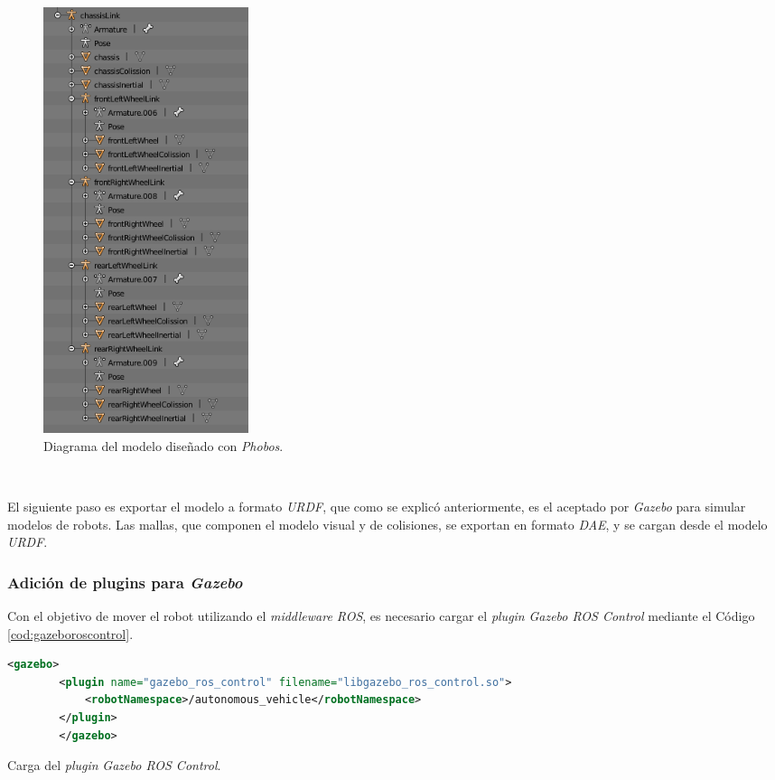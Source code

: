 \begin{figure} [h!]
	\begin{center}
		\includegraphics[width=6cm]{figs/phobosDiagram}
	\end{center}
	\caption{Diagrama del modelo diseñado con \textit{Phobos}.}
	\label{fig:blenderdiagram}
\end{figure}\

El siguiente paso es exportar el modelo a formato \textit{URDF}, que como se explicó anteriormente, es el aceptado por \textit{Gazebo} para simular modelos de robots. Las mallas,
que componen el modelo visual y de colisiones, se exportan en formato \textit{DAE}, y se cargan desde el modelo \textit{URDF}.\\

\subsubsection{Adición de plugins para \textit{Gazebo}}

Con el objetivo de mover el robot utilizando el \textit{middleware ROS}, es necesario cargar el \textit{plugin} \textit{Gazebo ROS Control} mediante el Código
\ref{cod:gazeboroscontrol}.\\

\begin{code}[h]
	\begin{lstlisting}[language=XML]
		<gazebo>
		<plugin name="gazebo_ros_control" filename="libgazebo_ros_control.so">
			<robotNamespace>/autonomous_vehicle</robotNamespace>
		</plugin>
		</gazebo>
	\end{lstlisting}
	\caption[Carga del \textit{plugin} \textit{Gazebo ROS Control}.]{Carga del \textit{plugin} \textit{Gazebo ROS Control}.}
	\label{cod:gazeboroscontrol}
\end{code}

